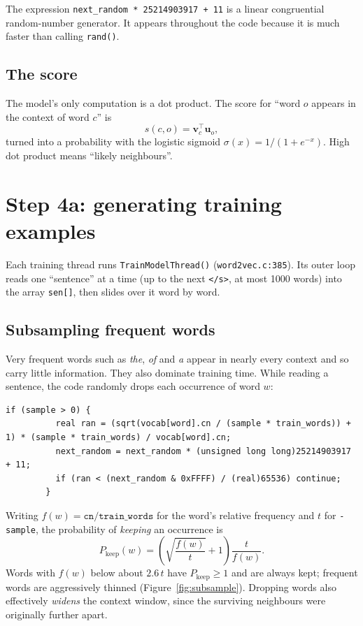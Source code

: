 \documentclass[11pt,a4paper]{article}
\newcommand{\code}[1]{\texttt{#1}}
\newcommand{\src}[1]{\texttt{word2vec.c:#1}}
\newcommand{\vin}{\mathbf{v}}
\newcommand{\vout}{\mathbf{u}}
\begin{document}
The expression \code{next\_random * 25214903917 + 11} is a linear congruential
random-number generator. It appears throughout the code because it is much
faster than calling \code{rand()}.

\subsection{The score}

The model's only computation is a dot product. The score for ``word $o$ appears
in the context of word $c$'' is
\[
  s(c,o) = \vin_c^{\top}\vout_o ,
\]
turned into a probability with the logistic sigmoid
$\sigma(x) = 1/(1+e^{-x})$. High dot product means ``likely neighbours''.

\section{Step 4a: generating training examples}

Each training thread runs \code{TrainModelThread()} (\src{385}). Its outer loop
reads one ``sentence'' at a time (up to the next \code{</s>}, at most 1000 words)
into the array \code{sen[]}, then slides over it word by word.

\subsection{Subsampling frequent words}

Very frequent words such as \emph{the}, \emph{of} and \emph{a} appear in nearly
every context and so carry little information. They also dominate training time.
While reading a sentence, the code randomly drops each occurrence of word $w$:

\begin{lstlisting}[firstnumber=423]
        if (sample > 0) {
          real ran = (sqrt(vocab[word].cn / (sample * train_words)) + 1) * (sample * train_words) / vocab[word].cn;
          next_random = next_random * (unsigned long long)25214903917 + 11;
          if (ran < (next_random & 0xFFFF) / (real)65536) continue;
        }
\end{lstlisting}

Writing $f(w) = \code{cn}/\code{train\_words}$ for the word's relative frequency and
$t$ for \code{-sample}, the probability of \emph{keeping} an occurrence is
\[
  P_{\text{keep}}(w) = \left(\sqrt{\frac{f(w)}{t}} + 1\right)\frac{t}{f(w)} .
\]
Words with $f(w)$ below about $2.6\,t$ have $P_{\text{keep}}\ge 1$ and are always kept;
frequent words are aggressively thinned (Figure~\ref{fig:subsample}). Dropping words
also effectively \emph{widens} the context window, since the surviving neighbours
were originally further apart.
\end{document}
